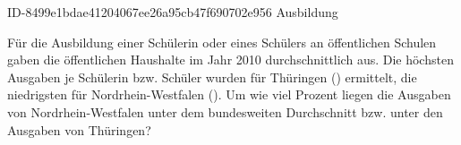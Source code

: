 \begin{exercise}
      {ID-8499e1bdae41204067ee26a95cb47f690702e956}
      {Ausbildung}
  \ifproblem\problem\par
    Für die Ausbildung einer Schülerin oder eines Schülers an öffentlichen Schulen
    gaben die öffentlichen Haushalte im Jahr 2010 durchschnittlich  aus.
    Die höchsten Ausgaben je Schülerin bzw. Schüler wurden für Thüringen ()
    ermittelt, die niedrigsten für Nordrhein-Westfalen ().
    Um wie viel Prozent liegen die Ausgaben von Nordrhein-Westfalen unter dem
    bundesweiten Durchschnitt bzw. unter den Ausgaben von Thüringen?
  \fi
\end{exercise}
